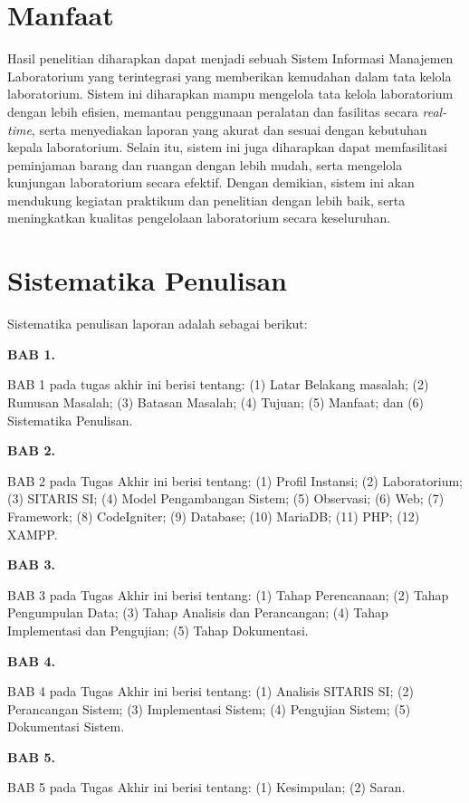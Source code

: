 \section{Manfaat}
Hasil penelitian diharapkan dapat menjadi sebuah Sistem Informasi Manajemen Laboratorium yang terintegrasi yang memberikan kemudahan dalam tata kelola laboratorium. Sistem ini diharapkan mampu mengelola tata kelola laboratorium dengan lebih efisien, memantau penggunaan peralatan dan fasilitas secara \textit{real-time}, serta menyediakan laporan yang akurat dan sesuai dengan kebutuhan kepala laboratorium. Selain itu, sistem ini juga diharapkan dapat memfasilitasi peminjaman barang dan ruangan dengan lebih mudah, serta mengelola kunjungan laboratorium secara efektif. Dengan demikian, sistem ini akan mendukung kegiatan praktikum dan penelitian dengan lebih baik, serta meningkatkan kualitas pengelolaan laboratorium secara keseluruhan.
\section{Sistematika Penulisan}
Sistematika penulisan laporan adalah sebagai berikut:

\textbf{BAB 1. \babSatu}

BAB 1 pada tugas akhir ini berisi tentang: (1) Latar Belakang masalah; (2) Rumusan Masalah; (3) Batasan Masalah; (4) Tujuan; (5) Manfaat; dan (6) Sistematika Penulisan.

\textbf{BAB 2. \babDua}

BAB 2 pada Tugas Akhir ini berisi tentang: (1) Profil Instansi; (2) Laboratorium; (3) SITARIS SI; (4) Model Pengambangan Sistem; (5) Observasi; (6) Web; (7) Framework; (8) CodeIgniter; (9) Database; (10) MariaDB; (11) PHP; (12) XAMPP.

\textbf{BAB 3. \babTiga}

BAB 3 pada Tugas Akhir ini berisi tentang: (1) Tahap Perencanaan; (2) Tahap Pengumpulan Data; (3) Tahap Analisis dan Perancangan; (4) Tahap Implementasi dan Pengujian; (5) Tahap Dokumentasi.

\textbf{BAB 4. \babEmpat}

BAB 4 pada Tugas Akhir ini berisi tentang: (1) Analisis SITARIS SI; (2) Perancangan Sistem; (3) Implementasi Sistem; (4) Pengujian Sistem; (5) Dokumentasi Sistem.

\textbf{BAB 5. \babLima}

BAB 5 pada Tugas Akhir ini berisi tentang: (1) Kesimpulan; (2) Saran.
